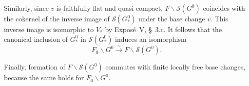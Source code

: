 Similarly, since \(v\) is faithfully flat and quasi-compact,
\(F\backslash\mathscr S(G^0)\) coincides with the cokernel of the
inverse image of \(\mathscr S(G^0_*)\) under the base change \(v\).
This inverse image is isomorphic to \(V_*\) by Expos\'e~V, \S~3.c.
It follows that the canonical inclusion of \(G^0_*\) in
\(\mathscr S(G^0_*)\) induces an isomorphism
\[
  F_0\backslash G^0
    \xrightarrow{\ \sim\ }
  F\backslash\mathscr S(G^0).
\]

Finally, formation of \(F\backslash\mathscr S(G^0)\) commutes with
finite locally free base changes, because the same holds for
\(F_0\backslash G^0\).
